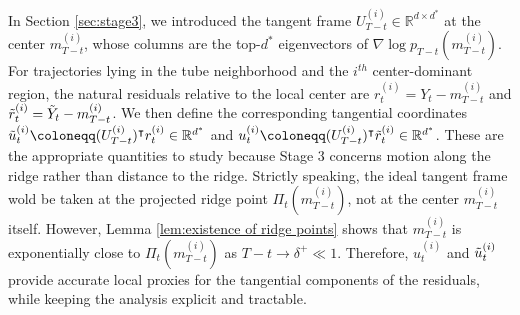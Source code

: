 \documentclass[11pt]{article}
\newcommand{\mb}{\mathbb}
\begin{document}
In Section \ref{sec:stage3}, we introduced the tangent frame  $U_{T-t}^{(i)}\in \mb{R}^{d\times d^*}$ at the center $m_{T-t}^{(i)}$, whose columns are the top-$d^*$ eigenvectors of $\nabla\log p_{T-t}(m_{T-t}^{(i)})$. For trajectories lying in the tube neighborhood and the $i^{th}$ center-dominant region, the natural residuals relative to the local center are $r_t^{(i)} = Y_t-m_{T-t}^{(i)}$ and $\Tilde{r}_t^{(i)} = \Tilde{Y}_t-m_{T-t}^{(i)}$. We then define the corresponding tangential coordinates $\Tilde{u}_t^{(i)} \coloneqq (U_{T-t}^{(i)})^\intercal  r_t^{(i)}  \in \mb{R}^{d^*}$ and $u_t^{(i)} \coloneqq (U_{T-t}^{(i)})^\intercal  \Tilde{r}_t^{(i)}  \in \mb{R}^{d^*}$. These are the appropriate quantities to study because Stage 3 concerns motion along the ridge rather than distance to the ridge. Strictly speaking, the ideal tangent frame wold be taken at the projected ridge point $\Pi_t(m_{T-t}^{(i)})$, not at the center $m_{T-t}^{(i)}$ itself. However, Lemma \ref{lem:existence of ridge points} shows that $m_{T-t}^{(i)}$ is exponentially close to $\Pi_t(m_{T-t}^{(i)})$ as $T-t\to \delta^+\ll 1$. Therefore, $u_t^{(i)}$ and $\Tilde{u}_t^{(i)}$ provide accurate local proxies for the tangential components of the residuals, while keeping the analysis explicit and tractable.
\end{document}
